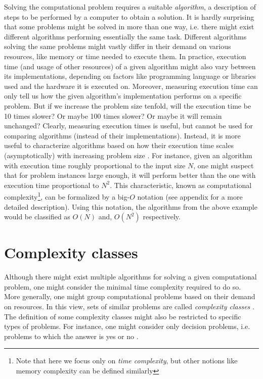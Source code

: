 Solving the computational problem requires a suitable \emph{algorithm}, a
description of steps to be performed by a computer to obtain a solution. It is
hardly surprising that some problems might be solved in more than one way, i.e.
there might exist different algorithms performing essentially the same task.
Different algorithms solving the same problems might vastly differ in their
demand on various resources, like memory or time needed to execute them. In
practice, execution time (and usage of other resources) of a given algorithm
might also vary between its implementations, depending on factors like
programming language or libraries used and the hardware it is executed on.
Moreover, measuring execution time can only tell us how the given algorithm's
implementation performs on a specific problem. But if we increase the problem
size tenfold, will the execution time be 10 times slower? Or maybe 100 times
slower? Or maybe it will remain unchanged? Clearly, measuring execution times
is useful, but cannot be used for comparing algorithms (instead of their
implementations). Instead, it is more useful to characterize algorithms based
on how their execution time scales (asymptotically) with increasing problem
size \cite{arora}. For instance, given an algorithm with execution time roughly
proportional to the input size $N$, one might suspect that for problem
instances large enough, it will perform better than the one with execution time
proportional to $N^{2}$. This characteristic, known as computational
complexity\footnote{Note that here we focus only on \emph{time complexity}, but
  other notions like memory complexity can be defined similarly}, can be
formalized by a big-$O$ notation (see appendix for a more detailed
description). Using this notation, the algorithms from the above example would
be classified as $O(N)$ and, $O(N^{2})$ respectively.

\section{Complexity classes}
Although there might exist multiple algorithms for solving a given
computational problem, one might consider the minimal time complexity required
to do so. More generally, one might group computational problems based on their
demand on resources. In this view, sets of similar problems are called
\emph{complexity classes} \cite{arora}. The definition of some complexity
classes might also be restricted to specific types of problems. For instance,
one might consider only decision problems, i.e. problems to which the answer is
yes or no \cite{arora}.

